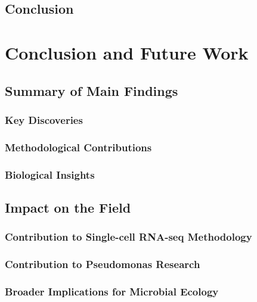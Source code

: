 \documentclass[
  11pt,
  a4paper,
]{report}
\begin{document}
\section{Conclusion}\label{conclusion}


\chapter{Conclusion and Future Work}\label{conclusion-and-future-work}

\section{Summary of Main Findings}\label{summary-of-main-findings}

\subsection{Key Discoveries}\label{key-discoveries}

\subsection{Methodological
Contributions}\label{methodological-contributions}

\subsection{Biological Insights}\label{biological-insights}

\section{Impact on the Field}\label{impact-on-the-field}

\subsection{Contribution to Single-cell RNA-seq
Methodology}\label{contribution-to-single-cell-rna-seq-methodology}

\subsection{Contribution to Pseudomonas
Research}\label{contribution-to-pseudomonas-research}

\subsection{Broader Implications for Microbial
Ecology}\label{broader-implications-for-microbial-ecology}
\end{document}
